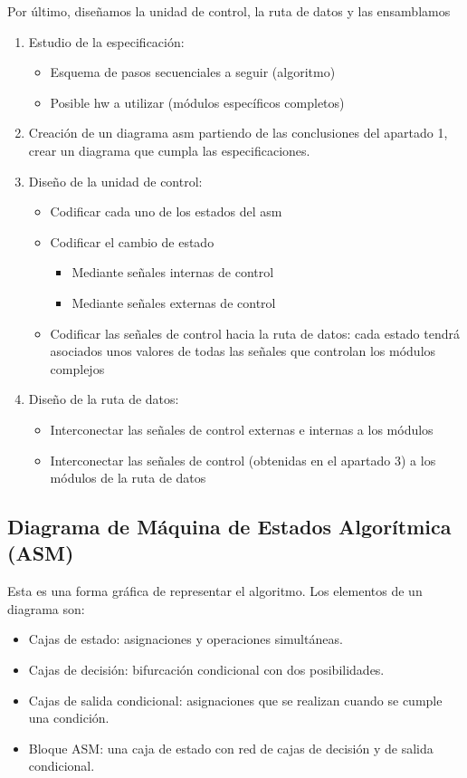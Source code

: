 Por último, diseñamos la unidad de control, la ruta de datos y las ensamblamos
\begin{enumerate}
	\item Estudio de la especificación:
	      \begin{itemize}
		      \item Esquema de pasos secuenciales a seguir (algoritmo)
		      \item Posible \gls{hw} a utilizar (módulos específicos completos)
	      \end{itemize}
	\item Creación de un diagrama \gls{asm} partiendo de las conclusiones del apartado 1, crear un diagrama que cumpla las especificaciones.
	\item Diseño de la unidad de control:
	      \begin{itemize}
		      \item Codificar cada uno de los estados del \gls{asm}
		      \item Codificar el cambio de estado
		            \begin{itemize}
			            \item Mediante señales internas de control
			            \item Mediante señales externas de control
		            \end{itemize}
		      \item Codificar las señales de control hacia la ruta de datos: cada estado tendrá asociados unos valores de todas las señales que controlan los módulos complejos
	      \end{itemize}
	\item Diseño de la ruta de datos:
	      \begin{itemize}
		      \item Interconectar las señales de control externas e internas a los módulos
		      \item Interconectar las señales de control (obtenidas en el apartado 3) a los módulos de la ruta de datos
	      \end{itemize}
\end{enumerate}


\subsection{Diagrama de Máquina de Estados Algorítmica (ASM)}
Esta es una forma gráfica de representar el algoritmo.
Los elementos de un diagrama son:
\begin{itemize}
	\item Cajas de estado: asignaciones y operaciones simultáneas.
	\item Cajas de decisión: bifurcación condicional con dos posibilidades.
	\item Cajas de salida condicional: asignaciones que se realizan cuando se cumple una condición.
	\item Bloque ASM: una caja de estado con red de cajas de decisión y de salida condicional.
\end{itemize}
